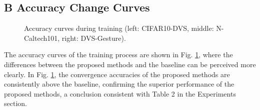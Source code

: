 \documentclass[letterpaper]{article} %
\begin{document}
\subsection{B Accuracy Change Curves}
\begin{figure}[!t]
\centering
{}
\caption{Accuracy curves during training (left: CIFAR10-DVS, middle: N-Caltech101, right: DVS-Gesture). }
\label{accuracy}
\end{figure}
The accuracy curves of the training process are shown in Fig. \ref{accuracy}, where the differences between the proposed methods and the baseline can be perceived more clearly. In Fig. \ref{accuracy}, the convergence accuracies of the proposed methods are consistently above the baseline, confirming the superior performance of the proposed methods, a conclusion consistent with Table 2 in the Experiments section.
\end{document}
